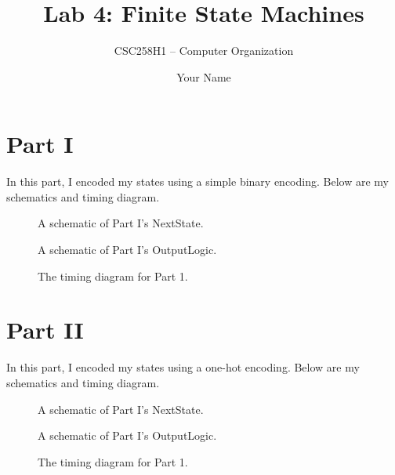 \documentclass[parskip=half]{scrarticle}
\title{Lab 4: Finite State Machines}
\subtitle{CSC258H1 -- Computer Organization}
\author{Your Name}
\begin{document}
\maketitle

\section*{Part I}

In this part, I encoded my states using a simple binary encoding.
Below are my schematics and timing diagram.

\begin{figure}[ht!]
    \centering
    \caption{A schematic of Part I's NextState.}
    \label{f:part1_next_state}
\end{figure}

\begin{figure}[ht!]
    \centering
    \caption{A schematic of Part I's OutputLogic.}
    \label{f:part1_output_logic}
\end{figure}

\begin{figure}[ht!]
    \centering
    \caption{The timing diagram for Part 1.}
    \label{f:part1_timing}
\end{figure}

\section*{Part II}

In this part, I encoded my states using a one-hot encoding.
Below are my schematics and timing diagram.

\begin{figure}[ht!]
    \centering
    \caption{A schematic of Part I's NextState.}
    \label{f:part2_next_state}
\end{figure}

\begin{figure}[ht!]
    \centering
    \caption{A schematic of Part I's OutputLogic.}
    \label{f:part2_output_logic}
\end{figure}

\begin{figure}[ht!]
    \centering
    \caption{The timing diagram for Part 1.}
    \label{f:part2_timing}
\end{figure}
\end{document}
